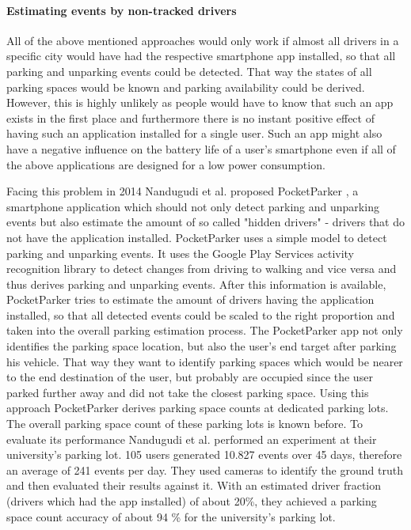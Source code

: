 \paragraph{Estimating events by non-tracked drivers}

All of the above mentioned approaches would only work if almost all drivers in a specific city would have had the respective smartphone app installed, so that all parking and unparking events could be detected. That way the states of all parking spaces would be known and parking availability could be derived. However, this is highly unlikely as people would have to know that such an app exists in the first place and furthermore there is no instant positive effect of having such an application installed for a single user. Such an app might also have a negative influence on the battery life of a user's smartphone even if all of the above applications are designed for a low power consumption.

Facing this problem in 2014 Nandugudi et al. proposed PocketParker \cite{Nandugudi:2014:PPP:2632048.2632098}, a smartphone application which should not only detect parking and unparking events but also estimate the amount of so called "hidden drivers" - drivers that do not have the application installed. PocketParker uses a simple model to detect parking and unparking events. It uses the Google Play Services activity recognition library to detect changes from driving to walking and vice versa and thus derives parking and unparking events. After this information is available, PocketParker tries to estimate the amount of drivers having the application installed, so that all detected events could be scaled to the right proportion and taken into the overall parking estimation process. The PocketParker app not only identifies the parking space location, but also the user's end target after parking his vehicle. That way they want to identify parking spaces which would be nearer to the end destination of the user, but probably are occupied since the user parked further away and did not take the closest parking space. Using this approach PocketParker derives parking space counts at dedicated parking lots. The overall parking space count of these parking lots is known before. To evaluate its performance Nandugudi et al. performed an experiment at their university's parking lot. 105 users generated 10.827 events over 45 days, therefore an average of 241 events per day. They used cameras to identify the ground truth and then evaluated their results against it. With an estimated driver fraction (drivers which had the app installed) of about 20\%, they achieved a parking space count accuracy of about 94 \% for the university's parking lot.

